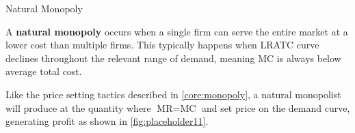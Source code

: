 \documentclass[10pt]{article}
\begin{document}
    \begin{core}[label=core:n_mono]{Natural Monopoly}

      A \textbf{natural monopoly} occurs when a single firm can serve the entire market at a lower cost than multiple firms. This typically happens when LRATC curve declines throughout the relevant range of demand, meaning MC is always below average total cost. 


      Like the price setting tactics described in \autoref{core:monopoly}, a natural monopolist will produce at the quantity where $\text{MR} = \text{MC}$ and set price on the demand curve, generating profit as shown in \autoref{fig:placeholder11}.

    \end{core}
\end{document}
